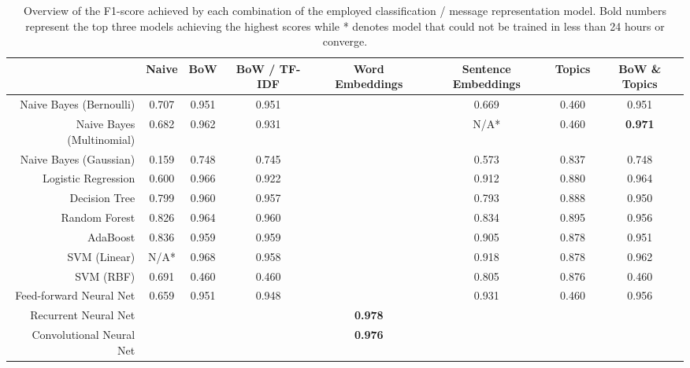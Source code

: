 \documentclass[letterpaper]{article}
\begin{document}
\begin{landscape}
	\begin{table}[t!]
		\centering
		\caption{Overview of the F1-score achieved by each combination of the employed classification / message representation model. Bold numbers represent the top three models achieving the highest scores while * denotes model that could not be trained in less than 24 hours or converge.}
		\label{tb: macro_f1}
		\begin{tabular}{@{}rccccccc@{}}
			\toprule
			                                               & Naive & BoW & BoW / TF-IDF & Word Embeddings & Sentence Embeddings & Topics & BoW \& Topics \\ \midrule
			\multicolumn{1}{r|}{Naive Bayes (Bernoulli)}   & 0.707 & 0.951 & 0.951        &                 & 0.669               & 0.460  & 0.951         \\
			\multicolumn{1}{r|}{Naive Bayes (Multinomial)} & 0.682 & 0.962 & 0.931        &                 & N/A*                & 0.460  & \textbf{0.971}\\
			\multicolumn{1}{r|}{Naive Bayes (Gaussian)}    & 0.159 & 0.748 & 0.745        &                 & 0.573               & 0.837  & 0.748         \\
			\multicolumn{1}{r|}{Logistic Regression}       & 0.600 & 0.966 & 0.922        &                 & 0.912               & 0.880  & 0.964         \\
			\hline
			\multicolumn{1}{r|}{Decision Tree}             & 0.799 & 0.960 & 0.957        &                 & 0.793               & 0.888  & 0.950         \\
			\multicolumn{1}{r|}{Random Forest}             & 0.826 & 0.964 & 0.960        &                 & 0.834               & 0.895  & 0.956         \\
			\multicolumn{1}{r|}{AdaBoost}                  & 0.836 & 0.959 & 0.959        &                 & 0.905               & 0.878  & 0.951         \\
			\multicolumn{1}{r|}{SVM (Linear)}              & N/A*   & 0.968 & 0.958        &                 & 0.918               & 0.878  & 0.962         \\
			\multicolumn{1}{r|}{SVM (RBF)}                 & 0.691 & 0.460 & 0.460        &                 & 0.805               & 0.876  & 0.460         \\
			\hline
			\multicolumn{1}{r|}{Feed-forward Neural Net}   & 0.659 & 0.951 & 0.948        &                 & 0.931               & 0.460  & 0.956         \\
			\multicolumn{1}{r|}{Recurrent Neural Net}      &       &     &              & \textbf{0.978}  &                     &        &               \\
			\multicolumn{1}{r|}{Convolutional Neural Net}  &       &     &              & \textbf{0.976}  &                     &        &               \\ \bottomrule
		\end{tabular}
	\end{table}
\end{landscape}
\end{document}

